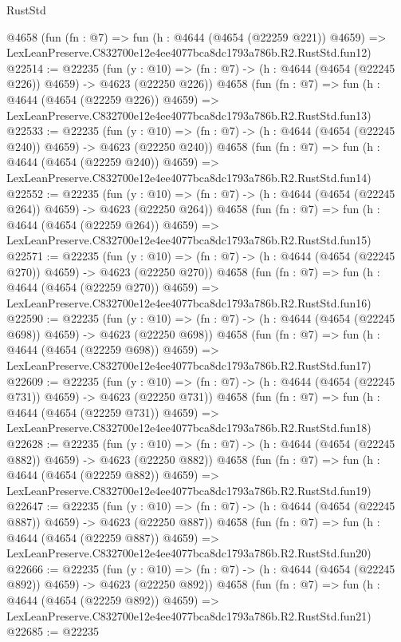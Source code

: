 \begin{lexlean}{RustStd}
\begin{coremodule}
    @4658
    (fun (fn : @7) =>
    fun (h : @4644 (@4654 (@22259 @221)) @4659) =>
    LexLeanPreserve.C832700e12e4ee4077bca8dc1793a786b.R2.RustStd.fun12)
@22514 := @22235
    (fun (y : @10) => (fn : @7) -> (h : @4644 (@4654 (@22245 @226)) @4659) -> @4623 (@22250 @226))
    @4658
    (fun (fn : @7) =>
    fun (h : @4644 (@4654 (@22259 @226)) @4659) =>
    LexLeanPreserve.C832700e12e4ee4077bca8dc1793a786b.R2.RustStd.fun13)
@22533 := @22235
    (fun (y : @10) => (fn : @7) -> (h : @4644 (@4654 (@22245 @240)) @4659) -> @4623 (@22250 @240))
    @4658
    (fun (fn : @7) =>
    fun (h : @4644 (@4654 (@22259 @240)) @4659) =>
    LexLeanPreserve.C832700e12e4ee4077bca8dc1793a786b.R2.RustStd.fun14)
@22552 := @22235
    (fun (y : @10) => (fn : @7) -> (h : @4644 (@4654 (@22245 @264)) @4659) -> @4623 (@22250 @264))
    @4658
    (fun (fn : @7) =>
    fun (h : @4644 (@4654 (@22259 @264)) @4659) =>
    LexLeanPreserve.C832700e12e4ee4077bca8dc1793a786b.R2.RustStd.fun15)
@22571 := @22235
    (fun (y : @10) => (fn : @7) -> (h : @4644 (@4654 (@22245 @270)) @4659) -> @4623 (@22250 @270))
    @4658
    (fun (fn : @7) =>
    fun (h : @4644 (@4654 (@22259 @270)) @4659) =>
    LexLeanPreserve.C832700e12e4ee4077bca8dc1793a786b.R2.RustStd.fun16)
@22590 := @22235
    (fun (y : @10) => (fn : @7) -> (h : @4644 (@4654 (@22245 @698)) @4659) -> @4623 (@22250 @698))
    @4658
    (fun (fn : @7) =>
    fun (h : @4644 (@4654 (@22259 @698)) @4659) =>
    LexLeanPreserve.C832700e12e4ee4077bca8dc1793a786b.R2.RustStd.fun17)
@22609 := @22235
    (fun (y : @10) => (fn : @7) -> (h : @4644 (@4654 (@22245 @731)) @4659) -> @4623 (@22250 @731))
    @4658
    (fun (fn : @7) =>
    fun (h : @4644 (@4654 (@22259 @731)) @4659) =>
    LexLeanPreserve.C832700e12e4ee4077bca8dc1793a786b.R2.RustStd.fun18)
@22628 := @22235
    (fun (y : @10) => (fn : @7) -> (h : @4644 (@4654 (@22245 @882)) @4659) -> @4623 (@22250 @882))
    @4658
    (fun (fn : @7) =>
    fun (h : @4644 (@4654 (@22259 @882)) @4659) =>
    LexLeanPreserve.C832700e12e4ee4077bca8dc1793a786b.R2.RustStd.fun19)
@22647 := @22235
    (fun (y : @10) => (fn : @7) -> (h : @4644 (@4654 (@22245 @887)) @4659) -> @4623 (@22250 @887))
    @4658
    (fun (fn : @7) =>
    fun (h : @4644 (@4654 (@22259 @887)) @4659) =>
    LexLeanPreserve.C832700e12e4ee4077bca8dc1793a786b.R2.RustStd.fun20)
@22666 := @22235
    (fun (y : @10) => (fn : @7) -> (h : @4644 (@4654 (@22245 @892)) @4659) -> @4623 (@22250 @892))
    @4658
    (fun (fn : @7) =>
    fun (h : @4644 (@4654 (@22259 @892)) @4659) =>
    LexLeanPreserve.C832700e12e4ee4077bca8dc1793a786b.R2.RustStd.fun21)
@22685 := @22235

\end{coremodule}
\end{lexlean}
